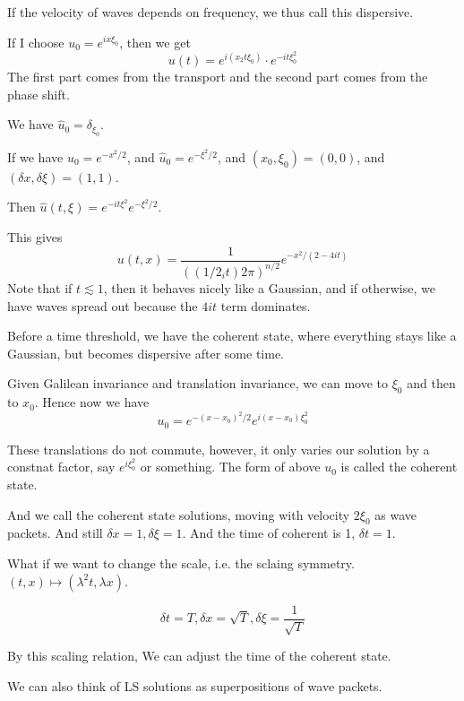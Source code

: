 If the velocity of waves depends on frequency, we thus call this dispersive.

If I choose $u_0=e^{ix\xi_0}$, then we get
\begin{equation*}
    u(t)=e^{i(x_2t\xi_0)}\cdot e^{-it\xi_0^2}
\end{equation*}
The first part comes from the transport and the second part comes from the phase shift.

We have $\widehat{u}_0=\delta_{\xi_0}$. 

If we have $u_0=e^{-x^2/2}$, and $\widehat{u}_0=e^{-\xi^2/2}$, and $(x_0, \xi_0)=(0,0)$, and $(\delta x, \delta \xi)=(1,1)$.

Then $\widehat{u}(t,\xi)=e^{-it\xi^2}e^{-\xi^2/2}$. 

This gives
\begin{equation*}
    u(t,x)=\frac{1}{((1/2_it)2\pi)^{n/2}}e^{-x^2/(2-4it)}
\end{equation*}
Note that if $t\lesssim 1$, then it behaves nicely like a Gaussian, and if otherwise, we have waves spread out because the $4it$ term dominates.

Before a time threshold, we have the coherent state, where everything stays like a Gaussian, but becomes dispersive after some time.

Given Galilean invariance and translation invariance, we can move to $\xi_0$ and then to $x_0$. Hence now we have
\begin{equation*}
    u_0=e^{-(x-x_0)^2/2}e^{i(x-x_0)\xi_0^2}
\end{equation*}

These translations do not commute, however, it only varies our solution by a constnat factor, say $e^{i\xi_0^2}$ or something. The form of above $u_0$ is called the coherent state.

And we call the coherent state solutions, moving with velocity $2\xi_0$ as wave packets. And still $\delta x=1, \delta\xi=1$. And the time of coherent is 1, $\delta t=1$.

What if we want to change the scale, i.e. the sclaing symmetry. $(t,x)\mapsto (\lambda^2 t, \lambda x)$.

\begin{equation*}
    \delta t=T, \delta x=\sqrt{T}, \delta\xi=\frac{1}{\sqrt{T}}
\end{equation*}

By this scaling relation, We can adjust the time of the coherent state.

We can also think of LS solutions as superpositions of wave packets.

